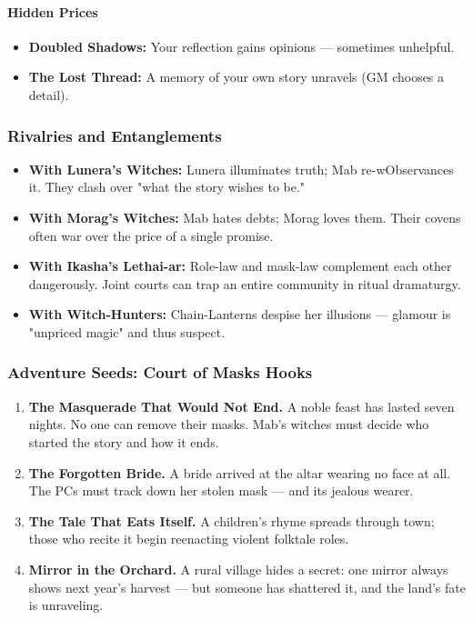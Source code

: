 \documentclass[11pt]{book}
\begin{document}
\paragraph{Hidden Prices}
\begin{itemize}[leftmargin=*]
    \item \textbf{Doubled Shadows:} Your reflection gains opinions --- sometimes unhelpful.
    \item \textbf{The Lost Thread:} A memory of your own story unravels (GM chooses a detail).
\end{itemize}

\subsubsection{Rivalries and Entanglements}

\begin{itemize}[leftmargin=*]
    \item \textbf{With Lunera's Witches:} Lunera illuminates truth; Mab re-wObservances it. They clash over "what the story wishes to be."
    \item \textbf{With Morag's Witches:} Mab hates debts; Morag loves them. Their covens often war over the price of a single promise.
    \item \textbf{With Ikasha's Lethai-ar:} Role-law and mask-law complement each other dangerously. Joint courts can trap an entire community in ritual dramaturgy.
    \item \textbf{With Witch-Hunters:} Chain-Lanterns despise her illusions --- glamour is "unpriced magic" and thus suspect.
\end{itemize}

\subsubsection{Adventure Seeds: Court of Masks Hooks}

\begin{enumerate}[leftmargin=*]
    \item \textbf{The Masquerade That Would Not End.} A noble feast has lasted seven nights. No one can remove their masks. Mab's witches must decide who started the story and how it ends.
    \item \textbf{The Forgotten Bride.} A bride arrived at the altar wearing no face at all. The PCs must track down her stolen mask --- and its jealous wearer.
    \item \textbf{The Tale That Eats Itself.} A children's rhyme spreads through town; those who recite it begin reenacting violent folktale roles.
    \item \textbf{Mirror in the Orchard.} A rural village hides a secret: one mirror always shows next year's harvest --- but someone has shattered it, and the land's fate is unraveling.
\end{enumerate}
\end{document}
